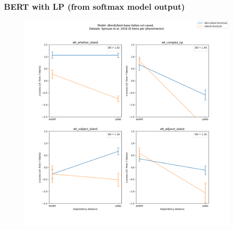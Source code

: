 \clearpage
\subsubsection{BERT with LP (from softmax model output)}
\begin{figure}[h]
	\centering
	\includegraphics[width=1\textwidth]{images/Chapter1/Sprouse_wh_dbmdz_bert-base-italian-xxl-cased_LP-zscores-likert-2022-07-11.png} 
\end{figure}

\clearpage
